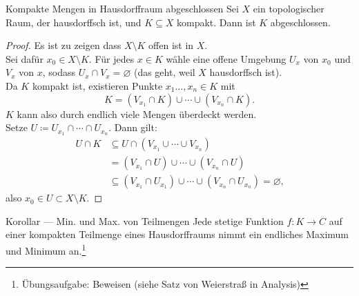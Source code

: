\begin{lemma}{Kompakte Mengen in Hausdorffraum abgeschlossen}
  Sei $ X $ ein topologischer Raum, der hausdorffsch ist, und $ K \subseteq X $ kompakt. Dann ist $ K $ abgeschlossen.
  \begin{proof}
    Es ist zu zeigen dass $ X \setminus K $ offen ist in $ X $. \\
    Sei dafür $ x_0 \in X \setminus K $. Für jedes $ x \in K $ wähle eine offene Umgebung $ U_x $ von $ x_0 $ und $ V_x $ von $ x $, sodass $ U_x \cap V_x = \varnothing $ (das geht, weil $ X $ hausdorffsch ist). \\
    Da $ K $ kompakt ist, existieren Punkte $ x_1 \dots, x_n \in K $ mit
    \begin{equation*}
      K = (V_{x_1} \cap K) \cup \cdots \cup (V_{x_n} \cap K)\text{.}
    \end{equation*}
    $ K $ kann also durch endlich viele Mengen überdeckt werden. \\
    Setze $ U \coloneqq U_{x_1} \cap \cdots \cap U_{x_n} $. Dann gilt:
    \begin{align*}
      U \cap K &\subseteq U \cap (V_{x_1} \cup \cdots \cup V_{x_n}) \\
       &= (V_{x_1} \cap U) \cup \cdots \cup (V_{x_n} \cap U) \\
       &\subseteq (V_{x_1} \cap U_{x_1}) \cup \cdots \cup (V_{x_n} \cap U_{x_n}) = \varnothing\text{,}
    \end{align*}
    also $ x_0 \in U \subset X \setminus K $.
  \end{proof}
\end{lemma}

\begin{remark}{Korollar --- Min. und Max. von Teilmengen}
  Jede stetige Funktion $ f : K \to C $ auf einer kompakten Teilmenge eines Hausdorffraums nimmt ein endliches Maximum und Minimum an.\footnote{Übungsaufgabe: Beweisen (siehe Satz von Weierstraß in Analysis)}
\end{remark}

